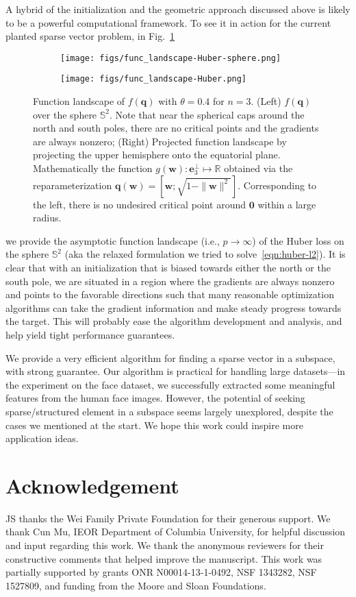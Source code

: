 \documentclass[11pt, journal, final]{IEEEtran}
\numberwithin{equation}{section}
\newcommand{\mb}{\mathbf}
\newcommand{\bb}{\mathbb}
\begin{document}
{A hybrid of the initialization and the geometric approach discussed above is likely to be a powerful computational framework. To see it in action for the current planted sparse vector problem, in Fig.~\ref{fig:landscape}
\begin{figure}[!htbp]
\centering
\begin{subfigure}
    \centering
    	\texttt{[image: figs/func\_landscape-Huber-sphere.png]}
\end{subfigure}
\begin{subfigure}
    \centering
    	\texttt{[image: figs/func\_landscape-Huber.png]}
\end{subfigure}
\caption{Function landscape of $f(\mb q)$ with $\theta =0.4$ for $n = 3$. (Left) $f(\mb q)$ over the sphere $\bb S^2$. Note that near the spherical caps around the north and south poles, there are no critical points and the gradients are always nonzero; (Right) Projected function landscape by projecting the upper hemisphere onto the equatorial plane. Mathematically the function $g(\mb w) : \mb e_3^\perp \mapsto \bb R$ obtained via the reparameterization $\mb q(\mb w) =  [\mb w; \sqrt{1 - \|\mb w\|^2 }]$. Corresponding to the left, there is no undesired critical point around $\mb 0$ within a large radius. }
\label{fig:landscape}
\end{figure}
we provide the asymptotic function landscape (i.e., $p \to \infty$) of the Huber loss on the sphere $\bb S^{2}$ (aka the relaxed formulation we tried to solve~\eqref{eqn:huber-l2}). It is clear that with an initialization that is biased towards either the north or the south pole, we are situated in a region where the gradients are always nonzero and points to the favorable directions such that many reasonable optimization algorithms can take the gradient information and make steady progress towards the target. This will probably ease the algorithm development and analysis, and help yield tight performance guarantees.

We provide a very efficient algorithm for finding a sparse vector in a subspace, with strong guarantee. Our algorithm is practical for handling large datasets---in the experiment on the face dataset, we successfully extracted some meaningful features from the human face images. However, the potential of seeking sparse/structured element in a subspace seems largely unexplored, despite the cases we mentioned at the start. We hope this work could inspire more application ideas.

\section*{Acknowledgement}
JS thanks the Wei Family Private Foundation for their generous support. We thank Cun Mu, IEOR Department of Columbia University, for helpful discussion and input regarding this work. We thank the anonymous reviewers for their constructive comments that helped improve the manuscript. This work was partially supported by grants ONR N00014-13-1-0492, NSF 1343282, NSF 1527809, and funding from the Moore and Sloan Foundations.

}
\end{document}

